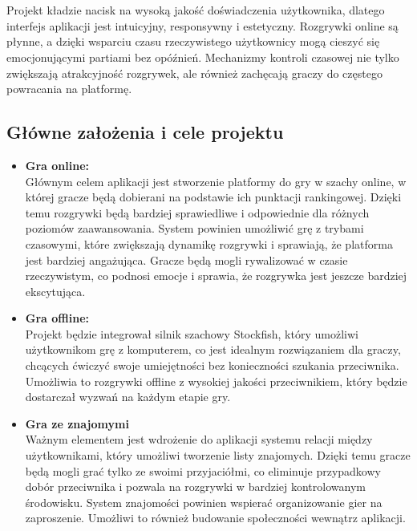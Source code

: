 \documentclass[12pt,a4paper]{article}
\begin{document}
\\\\
Projekt kładzie nacisk na wysoką jakość doświadczenia użytkownika, dlatego interfejs aplikacji jest intuicyjny, responsywny i estetyczny. Rozgrywki online są płynne, a dzięki wsparciu czasu rzeczywistego użytkownicy mogą cieszyć się emocjonującymi partiami bez opóźnień. Mechanizmy kontroli czasowej nie tylko zwiększają atrakcyjność rozgrywek, ale również zachęcają graczy do częstego powracania na platformę.

\newpage

\subsection{Główne założenia i cele projektu}

\begin{itemize}
    \item \textbf{Gra online:}\\
    Głównym celem aplikacji jest stworzenie platformy do gry w szachy online, w której gracze będą dobierani na podstawie ich punktacji rankingowej. Dzięki temu rozgrywki będą bardziej sprawiedliwe i odpowiednie dla różnych poziomów zaawansowania. System powinien umożliwić grę z trybami czasowymi, które zwiększają dynamikę rozgrywki i sprawiają, że platforma jest bardziej angażująca. Gracze będą mogli rywalizować w czasie rzeczywistym, co podnosi emocje i sprawia, że rozgrywka jest jeszcze bardziej ekscytująca.

    \item \textbf{Gra offline:}\\
    Projekt będzie integrował silnik szachowy Stockfish, który umożliwi użytkownikom grę z komputerem, co jest idealnym rozwiązaniem dla graczy, chcących ćwiczyć swoje umiejętności bez konieczności szukania przeciwnika. Umożliwia to rozgrywki offline z wysokiej jakości przeciwnikiem, który będzie dostarczał wyzwań na każdym etapie gry.

    \item \textbf{Gra ze znajomymi}\\
    Ważnym elementem jest wdrożenie do aplikacji systemu relacji między użytkownikami, który umożliwi tworzenie listy znajomych. Dzięki temu gracze będą mogli grać tylko ze swoimi przyjaciółmi, co eliminuje przypadkowy dobór przeciwnika i pozwala na rozgrywki w bardziej kontrolowanym środowisku. System znajomości powinien wspierać organizowanie gier na zaproszenie. Umożliwi to również budowanie społeczności wewnątrz aplikacji.


\end{itemize}
\end{document}
